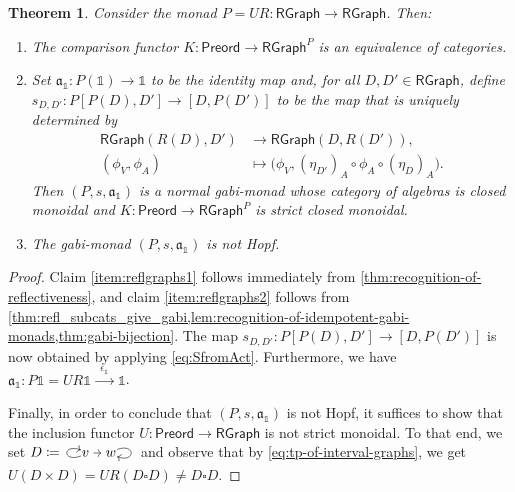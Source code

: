 \documentclass[12pt,dvipsnames,oneside]{amsart}
\theoremstyle{plain}
\newtheorem{theorem}[proposition]{Theorem}
\theoremstyle{remark}
\theoremstyle{definition}
\newcommand*{\from}{\colon}
\newcommand{\preord}{\mathsf{Preord}}
\newcommand{\rgraph}{\mathsf{RGraph}}
\newcommand{\tu}{\mathbb{1}}
\newcommand{\forget}{U}
\newcommand*{\defeq}{\coloneqq}
\begin{document}
\begin{theorem}\label{thm:s-map-reflexive-graphs}
  Consider the monad \(P=\forget R \from \rgraph \to \rgraph\). Then:
  \begin{enumerate}[label=\textnormal{(\arabic*)},leftmargin=0.8cm]
    \item\label{item:reflgraphs1} The comparison functor \(K \from \preord \to \rgraph^{P}\) is an equivalence of categories.
    \item\label{item:reflgraphs2} Set \(\mathfrak{a}_{\tu}\from P(\tu) \to \tu\) to be the identity map and, for all \(D, D' \in \rgraph\),
    define \(s_{D,D'}\colon P[P(D),D'] \to [D,P(D')]\) to be the map that is uniquely determined by
    \begin{align*}
      \rgraph(R(D), D') &\to \rgraph(D,R(D')), \\
      (\phi_V,\phi_A) &\mapsto \big(\phi_V,(\eta_{D'})_A \circ \phi_A \circ (\eta_D)_A\big).
    \end{align*}
    Then \((P,s,\mathfrak{a}_{\tu})\) is a normal gabi-monad whose category of algebras is closed monoidal and \(K \from \preord \to \rgraph^{P}\) is strict closed monoidal.
    \item\label{item:reflgraphs3} The gabi-monad \((P,s, \mathfrak{a}_{\tu})\) is not Hopf.
  \end{enumerate}
\end{theorem}
\begin{proof}
  Claim \ref{item:reflgraphs1} follows immediately from \cref{thm:recognition-of-reflectiveness},
  and claim \ref{item:reflgraphs2} follows from
  \cref{thm:refl_subcats_give_gabi,lem:recognition-of-idempotent-gabi-monads,thm:gabi-bijection}.
  The map \(s_{D,D'}\from P[P(D), D']\to [D, P(D')]\) is now obtained by applying \cref{eq:SfromAct}.
  Furthermore, we have \(\mathfrak{a}_{\tu} \from P\tu = \forget R\tu\xrightarrow{\;\;\epsilon_{\tu}\;\;}\tu\).

  Finally, in order to conclude that \((P, s, \mathfrak{a}_{\tu})\) is not Hopf, it suffices to show  that the inclusion functor \(\forget \from \preord \to \rgraph\) is not strict monoidal.
  To that end, we set \(D\defeq\!\!\vwrefldig\!\!\) and observe that by \cref{eq:tp-of-interval-graphs}, we get \(\forget(D \times D) = \forget R(D\square D) \neq D\square D\).
\end{proof}
\end{document}
